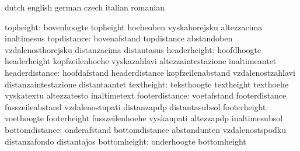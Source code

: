 


\startcommands                    dutch                            english
                                  german                           czech
                                  italian                          romanian

                       topheight: bovenhoogte                      topheight
                                  hoeheoben                        vyskahorejsku
                                  altezzacima                      inaltimesus
                     topdistance: bovenafstand                     topdistance
                                  abstandoben                      vzdalenosthorejsku
                                  distanzacima                     distantasus
                    headerheight: hoofdhoogte                      headerheight
                                  kopfzeilenhoehe                  vyskazahlavi
                                  altezzaintestazione              inaltimeantet
                  headerdistance: hoofdafstand                     headerdistance
                                  kopfzeilenabstand                vzdalenostzahlavi
                                  distanzaintestazione             distantaantet
                      textheight: teksthoogte                      textheight
                                  texthoehe                        vyskatextu
                                  altezzatesto                     inaltimetext
                  footerdistance: voetafstand                      footerdistance
                                  fusszeileabstand                 vzdalenostupati
                                  distanzapdp                      distantasubsol
                    footerheight: voethoogte                       footerheight
                                  fusszeilenhoehe                  vyskaupati
                                  altezzapdp                       inaltimesubsol
                  bottomdistance: onderafstand                     bottomdistance
                                  abstandunten                     vzdalenostspodku
                                  distanzafondo                    distantajos
                    bottomheight: onderhoogte                      bottomheight
